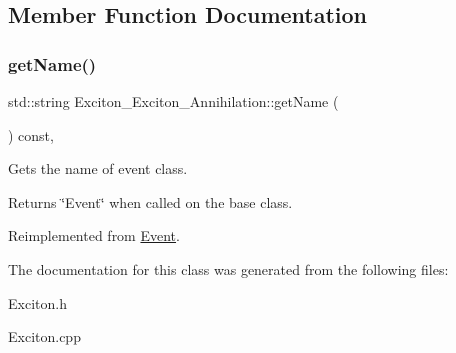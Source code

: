 \subsection{Member Function Documentation}
\mbox{\label{class_exciton___exciton___annihilation_a7027d2bee875a346e4c7ec4f07c55816}} 
\subsubsection{\texorpdfstring{get\+Name()}{getName()}}
{\footnotesize\ttfamily std\+::string Exciton\+\_\+\+Exciton\+\_\+\+Annihilation\+::get\+Name (\begin{DoxyParamCaption}{ }\end{DoxyParamCaption}) const\hspace{0.3cm}{\ttfamily [inline]}, {\ttfamily [virtual]}}



Gets the name of event class. 

\begin{DoxyReturn}{Returns}
\char`\"{}\+Event\char`\"{} when called on the base class. 
\end{DoxyReturn}


Reimplemented from \hyperlink{class_event_a8c38a406d844d05eac1ef007bad2487f}{Event}.



The documentation for this class was generated from the following files\+:\begin{DoxyCompactItemize}
\item 
Exciton.\+h\item 
Exciton.\+cpp\end{DoxyCompactItemize}
